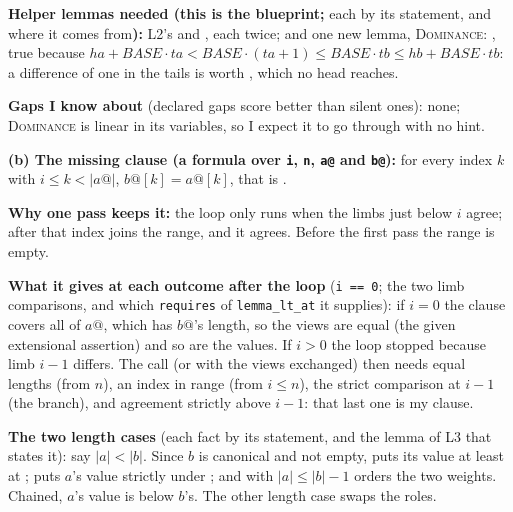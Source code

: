 \documentclass[11pt]{article}
\begin{document}
\begin{answer}
\textbf{Helper lemmas needed (this is the blueprint;} each by its statement,
and where it comes from\textbf{):} L2's  and
, each twice; and one new lemma, \textsc{Dominance}:
,
true because $ha + \mathit{BASE} \cdot ta < \mathit{BASE} \cdot (ta + 1) \leq
\mathit{BASE} \cdot tb \leq hb + \mathit{BASE} \cdot tb$: a difference of one
in the tails is worth , which no head reaches.

\textbf{Gaps I know about} (declared gaps score better than silent ones): none;
\textsc{Dominance} is linear in its variables, so I expect it to go through with
no hint.

\textbf{(b) The missing clause (a formula over \texttt{i}, \texttt{n},
\texttt{a@} and \texttt{b@}):} for every index $k$ with
$i \leq k < |a@|$, $b@[k] = a@[k]$, that is
.

\textbf{Why one pass keeps it:} the loop only runs when the limbs just below
$i$ agree; after  that index joins the range, and it agrees.
Before the first pass the range is empty.

\textbf{What it gives at each outcome after the loop} (\texttt{i == 0}; the
two limb comparisons, and which \texttt{requires} of \texttt{lemma\_lt\_at}
it supplies): if $i = 0$ the clause covers all of $a@$, which has $b@$'s
length, so the views are equal (the given extensional assertion) and so are
the values. If $i > 0$ the loop stopped because limb $i - 1$ differs. The
call  (or with the views exchanged) then needs
equal lengths (from $n$), an index in range (from $i \leq n$), the strict
comparison at $i - 1$ (the branch), and agreement strictly above $i - 1$:
that last one is my clause.

\textbf{The two length cases} (each fact by its statement, and the lemma of
L3 that states it): say $|a| < |b|$. Since $b$ is canonical and not empty,
 puts its value at least at
;  puts $a$'s value strictly
under ; and  with
$|a| \leq |b| - 1$ orders the two weights. Chained, $a$'s value is below
$b$'s. The other length case swaps the roles.
\end{answer}

\end{document}
